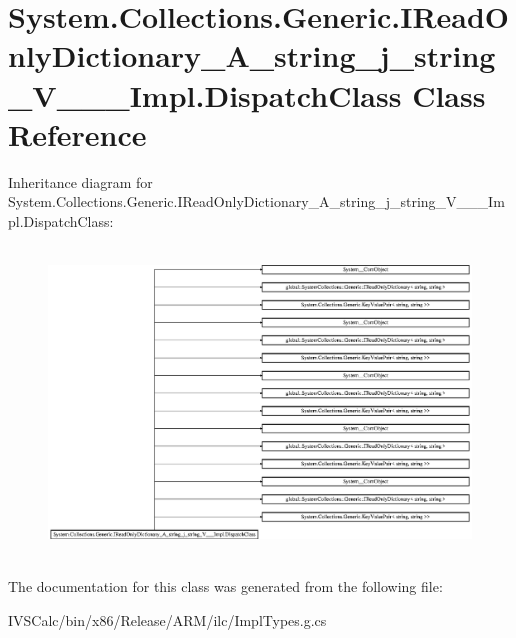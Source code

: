 \hypertarget{class_system_1_1_collections_1_1_generic_1_1_i_read_only_dictionary___a__string__j__string___v_______impl_1_1_dispatch_class}{}\section{System.\+Collections.\+Generic.\+I\+Read\+Only\+Dictionary\+\_\+\+A\+\_\+string\+\_\+j\+\_\+string\+\_\+\+V\+\_\+\+\_\+\+\_\+\+Impl.\+Dispatch\+Class Class Reference}
\label{class_system_1_1_collections_1_1_generic_1_1_i_read_only_dictionary___a__string__j__string___v_______impl_1_1_dispatch_class}
Inheritance diagram for System.\+Collections.\+Generic.\+I\+Read\+Only\+Dictionary\+\_\+\+A\+\_\+string\+\_\+j\+\_\+string\+\_\+\+V\+\_\+\+\_\+\+\_\+\+Impl.\+Dispatch\+Class\+:\begin{figure}[H]
\begin{center}
\leavevmode
\includegraphics[height=8.280961cm]{class_system_1_1_collections_1_1_generic_1_1_i_read_only_dictionary___a__string__j__string___v_______impl_1_1_dispatch_class}
\end{center}
\end{figure}


The documentation for this class was generated from the following file\+:\begin{DoxyCompactItemize}
\item 
I\+V\+S\+Calc/bin/x86/\+Release/\+A\+R\+M/ilc/Impl\+Types.\+g.\+cs\end{DoxyCompactItemize}
